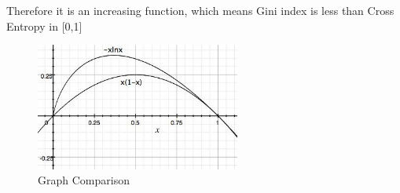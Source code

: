 \documentclass[paper=a4, fontsize=11pt]{scrartcl} %
\numberwithin{equation}{section} %
\numberwithin{figure}{section} %
\numberwithin{table}{section} %
\begin{document}
Therefore it is an increasing function, which means Gini index is less than Cross Entropy in [0,1]

\begin{figure}[h!]
  \caption{Graph Comparison}
  \centering
    \includegraphics[width=0.6\textwidth]{graph.jpg}
\end{figure}

\end{document}
